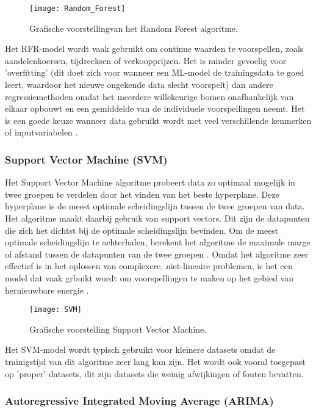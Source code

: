 \begin{figure}[h!]
    \centering\texttt{[image: Random\_Forest]}
    \caption{\label{fig:Random_Forest}Grafische voorstellingvan het Random Forest algoritme.}
\end{figure} 

Het RFR-model wordt vaak gebruikt om continue waarden te voorspellen, zoals aandelenkoersen, tijdreeksen of verkoopprijzen. Het is minder gevoelig voor 'overfitting' (dit doet zich voor wanneer een ML-model de trainingsdata te goed leert, waardoor het nieuwe ongekende data slecht voorspelt) dan andere regressiemethoden omdat het meerdere willekeurige bomen onafhankelijk van elkaar opbouwt en een gemiddelde van de individuele voorspellingen neemt. Het is een goede keuze wanneer data gebruikt wordt met veel verschillende kenmerken of inputvariabelen  \autocite{Sahai2023}.

\subsubsection{Support Vector Machine (SVM)}

Het Support Vector Machine algoritme probeert data zo optimaal mogelijk in twee groepen te verdelen door het vinden van het beste hyperplane. Deze hyperplane is de meest optimale scheidingslijn tussen de twee groepen van data. Het algoritme maakt daarbij gebruik van support vectors. Dit zijn de datapunten die zich het dichtst bij de optimale scheidingslijn bevinden. Om de meest optimale scheidingslijn te achterhalen, berekent het algoritme de maximale marge of afstand tussen de datapunten van de twee groepen  \autocite{Tziolis2024}. Omdat het algoritme zeer effectief is in het oplossen van complexere, niet-lineaire problemen, is het een model dat vaak grbuikt wordt om voorspellingen te maken op het gebied van hernieuwbare energie \autocite{Ahmad2018}. \\

\begin{figure}[h!]
    \centering\texttt{[image: SVM]}
    \caption{\label{fig:SVM}Grafische voorstelling Support Vector Machine.}
\end{figure} 

Het SVM-model wordt typisch gebruikt voor kleinere datasets omdat de trainigstijd van dit algoritme zeer lang kan zijn. Het wordt ook vooral toegepast op 'proper' datasets, dit zijn datasets die weinig afwijkingen of fouten bevatten.

\subsubsection{Autoregressive Integrated Moving Average (ARIMA)}

